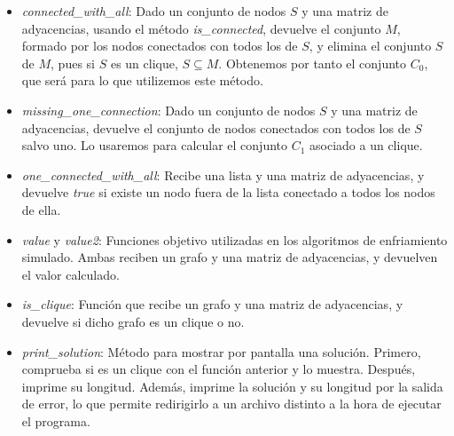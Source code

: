 \begin{itemize}
  \item \textit{connected\_with\_all}: Dado un conjunto de nodos $S$ y una matriz de adyacencias,
          usando el método \textit{is\_connected}, devuelve el conjunto $M$, formado por los nodos
        conectados con todos los de $S$, y elimina el conjunto $S$ de $M$, pues si $S$ es un clique,
        $S \subseteq M$. Obtenemos por tanto el conjunto $C_0$, que será para lo que utilizemos
        este método.

  \item \textit{missing\_one\_connection}: Dado un conjunto de nodos $S$ y una matriz de adyacencias,
        devuelve el conjunto de nodos conectados con todos los de $S$ salvo uno. Lo usaremos
        para calcular el conjunto $C_1$ asociado a un clique.

  \item \textit{one\_connected\_with\_all}: Recibe una lista y una matriz de adyacencias, y
        devuelve \textit{true} si existe un nodo fuera de la lista conectado a todos los
        nodos de ella.

  \item \textit{value} y \textit{value2}: Funciones objetivo utilizadas en los algoritmos
        de enfriamiento simulado. Ambas reciben un grafo y una matriz de adyacencias, y
        devuelven el valor calculado.

  \item \textit{is\_clique}: Función que recibe un grafo y una matriz de adyacencias, y
        devuelve si dicho grafo es un clique o no.

  \item \textit{print\_solution}: Método para mostrar por pantalla una solución. Primero,
        comprueba si es un clique con el función anterior y lo muestra. Después, imprime
        su longitud. Además, imprime la solución y su longitud por la salida de error,
        lo que permite redirigirlo a un archivo distinto a la hora de ejecutar el programa.

\end{itemize}
